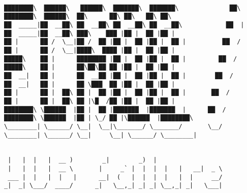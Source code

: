 \documentclass[varwidth=\maxdimen,margin=0.5cm,multi={verbatim}]{standalone}
\begin{document}
\begin{verbatim}

████████\  ██████\   ██████\  ███████\  ███████\              ██\       ████████\  ██████\  ██\      ██\ ██\   ██\ ██\
██  _____|██  __██\ ██  __██\ ██  __██\ ██  __██\            ██  |      ██  _____|██  __██\ ███\    ███ |██ |  ██ |██ |
██ |      ██ /  \__|██ /  ██ |██ |  ██ |██ |  ██ |          ██  /       ██ |      ██ /  \__|████\  ████ |██ |  ██ |██ |
█████\    ██ |      ████████ |██ |  ██ |██ |  ██ |         ██  /        █████\    ██ |      ██\██\██ ██ |██ |  ██ |██ |
██  __|   ██ |      ██  __██ |██ |  ██ |██ |  ██ |        ██  /         ██  __|   ██ |      ██ \███  ██ |██ |  ██ |██ |
██ |      ██ |  ██\ ██ |  ██ |██ |  ██ |██ |  ██ |       ██  /          ██ |      ██ |  ██\ ██ |\█  /██ |██ |  ██ |██ |
████████\ \██████  |██ |  ██ |███████  |███████  |      ██  /           ████████\ \██████  |██ | \_/ ██ |\██████  |████████\
\________| \______/ \__|  \__|\_______/ \_______/       \__/            \________| \______/ \__|     \__| \______/ \________|


 |   |  |   |  __ )        _|        _)  |
 |   |  |   |  __ \       |     _` |  |  |  |   |   __|  _ \
 ___ |  |   |  |   |      __|  (   |  |  |  |   |  |     __/
_|  _| \___/  ____/      _|   \__,_| _| _| \__,_| _|   \___|



\end{verbatim}
\end{document}
